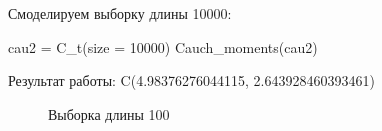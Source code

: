 \documentclass{article}
\begin{document}
Смоделируем выборку длины 10000:
\begin{python}
cau2 = C_t(size = 10000)
Cauch_moments(cau2)
\end{python}
Результат работы:
C(4.98376276044115, 2.643928460393461)
\begin{figure}[H]
	\caption{Выборка длины 100}
	\label{fig:image}
\end{figure}
\end{document}
